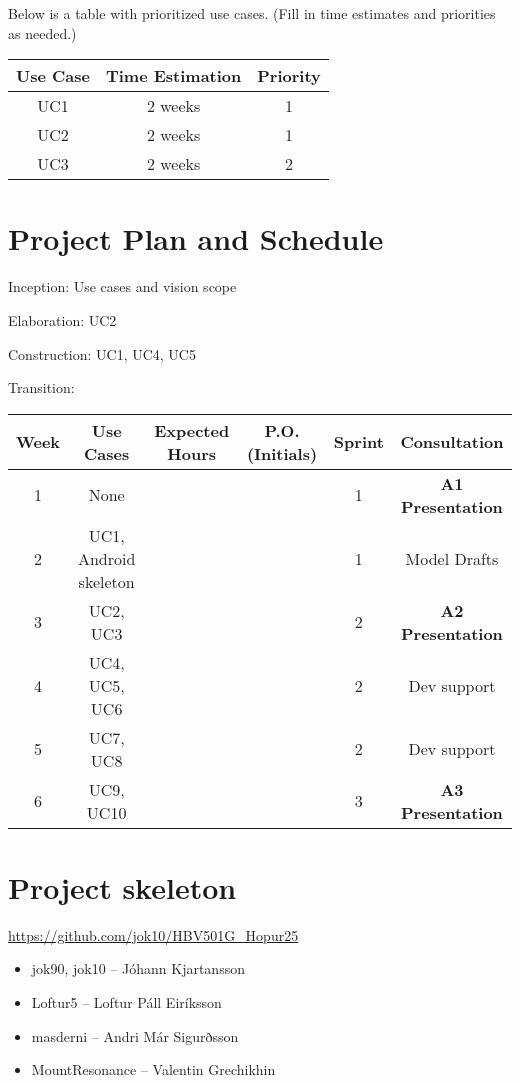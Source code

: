 \documentclass{article}
\begin{document}
Below is a table with prioritized use cases. (Fill in time estimates and priorities as needed.)

\begin{table}[h]
  \centering
  \begin{tabular}{|c|c|c|}
    \hline
    Use Case & Time Estimation & Priority \\ \hline
    UC1 & 2 weeks & 1 \\ \hline
    UC2 & 2 weeks & 1 \\ \hline
    UC3 & 2 weeks & 2 \\ \hline
  \end{tabular}
\end{table}

\section{Project Plan and Schedule}

Inception: Use cases and vision scope

Elaboration: UC2

Construction: UC1, UC4, UC5

Transition:

\begin{longtable}{|c|c|c|c|c|c|}
    \hline
    \textbf{Week} & \textbf{Use Cases} & \textbf{Expected Hours} & \textbf{P.O. (Initials)} & \textbf{Sprint} & \textbf{Consultation} \\
    \hline
    1 & None &  &  & 1 & \textbf{A1 Presentation} \\
    \hline
    2 & UC1, Android skeleton &  &  & 1 & Model Drafts \\
    \hline
    3 & UC2, UC3 &  &  & 2 & \textbf{A2 Presentation} \\
    \hline
    4 & UC4, UC5, UC6 &  &  & 2 & Dev support \\
    \hline
    5 & UC7, UC8 &  &  & 2 & Dev support \\
    \hline
    6 & UC9, UC10 &  &  & 3 & \textbf{A3 Presentation} \\
    \hline
\end{longtable}


\section{Project skeleton}


\url{https://github.com/jok10/HBV501G_Hopur25}

\begin{itemize}
  \item jok90, jok10 -- Jóhann Kjartansson
  \item Loftur5 -- Loftur Páll Eiríksson
  \item masderni -- Andri Már Sigurðsson
  \item MountResonance -- Valentin Grechikhin
\end{itemize}
\end{document}
